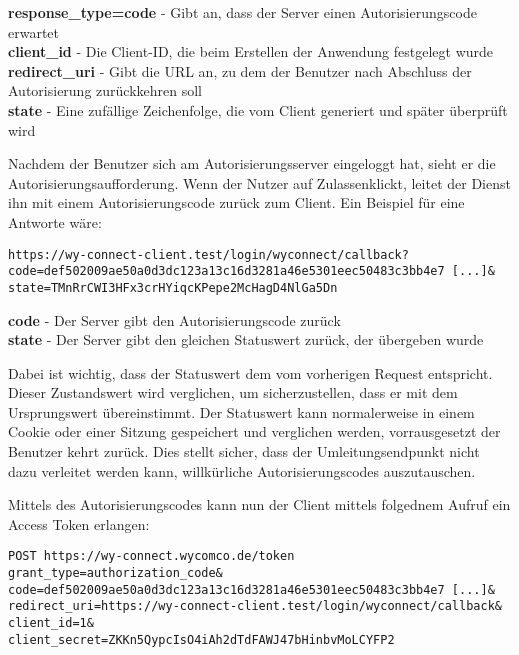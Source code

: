 \textbf{response\_type=code} - Gibt an, dass der Server einen Autorisierungscode erwartet \\
\textbf{client\_id} - Die Client-ID, die beim Erstellen der Anwendung festgelegt wurde \\
\textbf{redirect\_uri} - Gibt die URL an, zu dem der Benutzer nach Abschluss der Autorisierung zurückkehren soll \\
\textbf{state} - Eine zufällige Zeichenfolge, die vom Client generiert und später überprüft wird

Nachdem der Benutzer sich am Autorisierungsserver eingeloggt hat, sieht er die Autorisierungsaufforderung. Wenn der Nutzer auf \flqq Zulassen\frqq  klickt, leitet der Dienst ihn mit einem Autorisierungscode zurück zum Client. Ein Beispiel für eine Antworte wäre:

\texttt{https://wy-connect-client.test/login/wyconnect/callback?\\
code=def502009ae50a0d3dc123a13c16d3281a46e5301eec50483c3bb4e7 [...]\& \\
state=TMnRrCWI3HFx3crHYiqcKPepe2McHagD4NlGa5Dn
}

\textbf{code} - Der Server gibt den Autorisierungscode zurück \\
\textbf{state} - Der Server gibt den gleichen Statuswert zurück, der übergeben wurde

Dabei ist wichtig, dass der Statuswert dem vom vorherigen Request entspricht. Dieser Zustandswert wird verglichen, um sicherzustellen, dass er mit dem Ursprungswert übereinstimmt. Der Statuswert kann normalerweise in einem Cookie oder einer Sitzung gespeichert und verglichen werden, vorrausgesetzt der Benutzer kehrt zurück. Dies stellt sicher, dass der Umleitungsendpunkt nicht dazu verleitet werden kann, willkürliche Autorisierungscodes auszutauschen.

Mittels des Autorisierungscodes kann nun der Client mittels folgednem Aufruf ein Access Token erlangen: 

\texttt{POST https://wy-connect.wycomco.de/token \\
  grant\_type=authorization\_code\& \\
  code=def502009ae50a0d3dc123a13c16d3281a46e5301eec50483c3bb4e7 [...]\& \\
  redirect\_uri=https://wy-connect-client.test/login/wyconnect/callback\& \\
  client\_id=1\& \\
  client\_secret=ZKKn5QypcIsO4iAh2dTdFAWJ47bHinbvMoLCYFP2}
  
